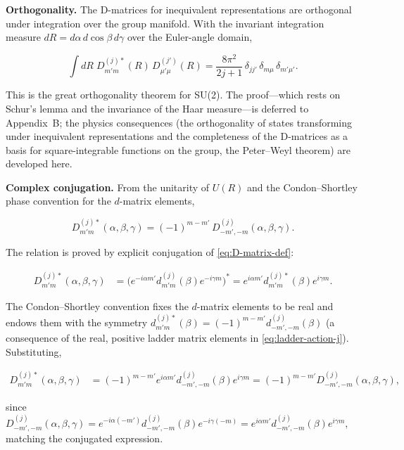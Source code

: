 \medskip\noindent\textbf{Orthogonality.} The D-matrices for inequivalent representations are orthogonal under integration over the group manifold. With the invariant integration measure $dR = d\alpha\,d\cos\beta\,d\gamma$ over the Euler-angle domain,
\begin{linenomath}
    \begin{equation}
        \int dR\; D^{(j)*}_{m'm}(R)\,D^{(j')}_{\mu'\mu}(R)
        = \frac{8\pi^2}{2j+1}\,\delta_{jj'}\,\delta_{m\mu}\,\delta_{m'\mu'}.
    \end{equation}
\end{linenomath}
This is the great orthogonality theorem for SU(2). The proof---which rests on Schur's lemma and the invariance of the Haar measure---is deferred to Appendix~B; the physics consequences (the orthogonality of states transforming under inequivalent representations and the completeness of the D-matrices as a basis for square-integrable functions on the group, the Peter--Weyl theorem) are developed here.

\medskip\noindent\textbf{Complex conjugation.} From the unitarity of $U(R)$ and the Condon--Shortley phase convention for the $d$-matrix elements,
\begin{linenomath}
    \begin{equation}
        D^{(j)*}_{m'm}(\alpha,\beta,\gamma)
        = (-1)^{m-m'}\,D^{(j)}_{-m',-m}(\alpha,\beta,\gamma).
    \end{equation}
\end{linenomath}
The relation is proved by explicit conjugation of \eqref{eq:D-matrix-def}:
\begin{linenomath}
\begin{align*}
D^{(j)*}_{m'm}(\alpha,\beta,\gamma)
&= \bigl(e^{-i\alpha m'} d^{(j)}_{m'm}(\beta) e^{-i\gamma m}\bigr)^*
 = e^{i\alpha m'} d^{(j)*}_{m'm}(\beta) e^{i\gamma m}.
\end{align*}
\end{linenomath}
The Condon--Shortley convention fixes the $d$-matrix elements to be real and endows them with the symmetry $d^{(j)*}_{m'm}(\beta) = (-1)^{m-m'} d^{(j)}_{-m',-m}(\beta)$ (a consequence of the real, positive ladder matrix elements in \eqref{eq:ladder-action-j}). Substituting,
\begin{linenomath}
\begin{align*}
D^{(j)*}_{m'm}(\alpha,\beta,\gamma)
&= (-1)^{m-m'} e^{i\alpha m'} d^{(j)}_{-m',-m}(\beta) e^{i\gamma m}
 = (-1)^{m-m'} D^{(j)}_{-m',-m}(\alpha,\beta,\gamma),
\end{align*}
\end{linenomath}
since $D^{(j)}_{-m',-m}(\alpha,\beta,\gamma)=e^{-i\alpha(-m')}d^{(j)}_{-m',-m}(\beta)e^{-i\gamma(-m)}=e^{i\alpha m'}d^{(j)}_{-m',-m}(\beta)e^{i\gamma m}$, matching the conjugated expression.


